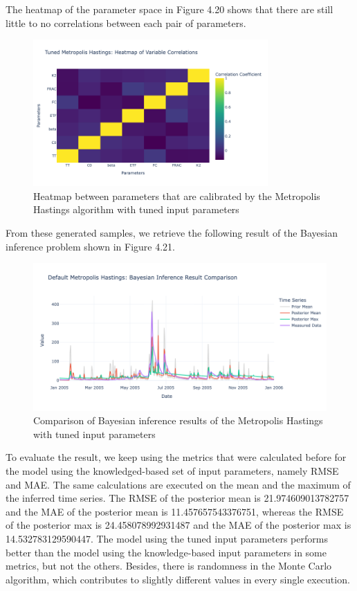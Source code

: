 The heatmap of the parameter space in Figure 4.20 shows that there are still little to no correlations between each pair of parameters.
\begin{figure}[H]
    \centering
    \includegraphics[width=0.8\textwidth]{figures/basic_mh/tuned_mh/tuned_mh_heatmap.png}
    \captionsetup{width=.8\textwidth}
    \caption{Heatmap between parameters that are calibrated by the Metropolis Hastings algorithm with tuned input parameters}
    \label{fig:enter-label}
\end{figure}

From these generated samples, we retrieve the following result of the Bayesian inference problem shown in Figure 4.21.

\begin{figure}[H]
    \centering
    \includegraphics[width=1\textwidth] {figures/basic_mh/tuned_mh/tuned_mh_bayes.png}
    \captionsetup{width=.8\textwidth}
    \caption{Comparison of Bayesian inference results of the Metropolis Hastings with tuned input parameters}
    \label{fig:enter-label}
\end{figure}

To evaluate the result, we keep using the metrics that were calculated before for the model using the knowledged-based set of input parameters, namely RMSE and MAE. The same calculations are executed on the mean and the maximum of the inferred time series. The RMSE of the posterior mean is 21.974609013782757 and the MAE of the posterior mean is 11.457657543376751, whereas the RMSE of the posterior max is 24.458078992931487 and the MAE of the posterior max is 14.532783129590447. The model using the tuned input parameters performs better than the model using the knowledge-based input parameters in some metrics, but not the others. Besides, there is randomness in the Monte Carlo algorithm,\cite{monte_carlo_randomness} which contributes to slightly different values in every single execution.

